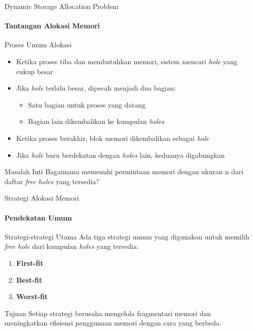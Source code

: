 \documentclass[10pt,aspectratio=169]{beamer}
\begin{document}
\begin{frame}{Dynamic Storage Allocation Problem}
    \framesubtitle{Tantangan Alokasi Memori}
    
    \begin{block}{Proses Umum Alokasi}
        \begin{itemize}
            \item Ketika proses tiba dan membutuhkan memori, sistem mencari \textit{hole} yang cukup besar
            \item Jika \textit{hole} terlalu besar, dipecah menjadi dua bagian:
            \begin{itemize}
                \item Satu bagian untuk proses yang datang
                \item Bagian lain dikembalikan ke kumpulan \textit{holes}
            \end{itemize}
            \item Ketika proses berakhir, blok memori dikembalikan sebagai \textit{hole}
            \item Jika \textit{hole} baru berdekatan dengan \textit{holes} lain, keduanya digabungkan
        \end{itemize}
    \end{block}
    
    \begin{alertblock}{Masalah Inti}
        Bagaimana memenuhi permintaan memori dengan ukuran n dari daftar \textit{free holes} yang tersedia?
    \end{alertblock}
\end{frame}

\begin{frame}{Strategi Alokasi Memori}
    \framesubtitle{Pendekatan Umum}
    
    \begin{block}{Strategi-strategi Utama}
        Ada tiga strategi umum yang digunakan untuk memilih \textit{free hole} dari kumpulan \textit{holes} yang tersedia:
        \begin{enumerate}
            \item \textbf{First-fit}
            \item \textbf{Best-fit}
            \item \textbf{Worst-fit}
        \end{enumerate}
    \end{block}
    
    \begin{alertblock}{Tujuan}
        Setiap strategi berusaha mengelola fragmentasi memori dan meningkatkan efisiensi penggunaan memori dengan cara yang berbeda.
    \end{alertblock}
\end{frame}
\end{document}
